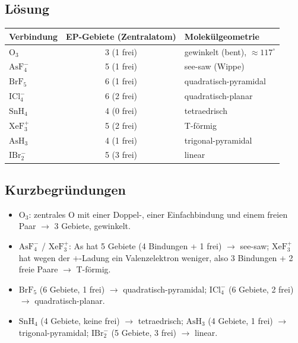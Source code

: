 
\subsection*{Lösung}
\begin{center}
\begin{tabular}{@{}l c l@{}}
  Verbindung & EP-Gebiete (Zentralatom) & Molekülgeometrie \\
  \hline
  $\mathrm{O_3}$    & 3 (1 frei)          & gewinkelt (bent), $\approx 117^\circ$ \\
  $\mathrm{AsF_4^-}$& 5 (1 frei)          & see-saw (Wippe) \\
  $\mathrm{BrF_5}$  & 6 (1 frei)          & quadratisch-pyramidal \\
  $\mathrm{ICl_4^-}$& 6 (2 frei)          & quadratisch-planar \\
  $\mathrm{SnH_4}$  & 4 (0 frei)          & tetraedrisch \\
  $\mathrm{XeF_3^+}$& 5 (2 frei)          & T-förmig \\
  $\mathrm{AsH_3}$  & 4 (1 frei)          & trigonal-pyramidal \\
  $\mathrm{IBr_2^-}$& 5 (3 frei)          & linear \\
\end{tabular}
\end{center}

\subsection*{Kurzbegründungen}
\begin{itemize}
  \item $\mathrm{O_3}$: zentrales O mit einer Doppel-, einer Einfachbindung und
        einem freien Paar $\to$ 3 Gebiete, gewinkelt.
  \item $\mathrm{AsF_4^-}$ / $\mathrm{XeF_3^+}$: As hat 5 Gebiete (4 Bindungen +
        1 frei) $\to$ see-saw; $\mathrm{XeF_3^+}$ hat wegen der $+$-Ladung ein
        Valenzelektron weniger, also 3 Bindungen + 2 freie Paare $\to$ T-förmig.
  \item $\mathrm{BrF_5}$ (6 Gebiete, 1 frei) $\to$ quadratisch-pyramidal;
        $\mathrm{ICl_4^-}$ (6 Gebiete, 2 frei) $\to$ quadratisch-planar.
  \item $\mathrm{SnH_4}$ (4 Gebiete, keine frei) $\to$ tetraedrisch;
        $\mathrm{AsH_3}$ (4 Gebiete, 1 frei) $\to$ trigonal-pyramidal;
        $\mathrm{IBr_2^-}$ (5 Gebiete, 3 frei) $\to$ linear.
\end{itemize}

